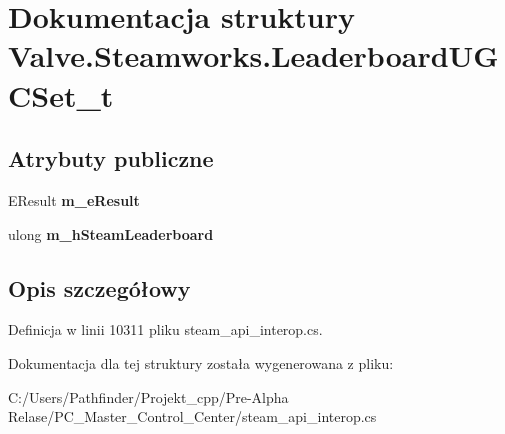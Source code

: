 \hypertarget{struct_valve_1_1_steamworks_1_1_leaderboard_u_g_c_set__t}{}\section{Dokumentacja struktury Valve.\+Steamworks.\+Leaderboard\+U\+G\+C\+Set\+\_\+t}
\label{struct_valve_1_1_steamworks_1_1_leaderboard_u_g_c_set__t}
\subsection*{Atrybuty publiczne}
\begin{DoxyCompactItemize}
\item 
\mbox{\label{struct_valve_1_1_steamworks_1_1_leaderboard_u_g_c_set__t_a882efa620bdd870901a0411f8df32756}} 
E\+Result {\bfseries m\+\_\+e\+Result}
\item 
\mbox{\label{struct_valve_1_1_steamworks_1_1_leaderboard_u_g_c_set__t_a9e0433f9d1a1813eb5e02ff0772368bc}} 
ulong {\bfseries m\+\_\+h\+Steam\+Leaderboard}
\end{DoxyCompactItemize}


\subsection{Opis szczegółowy}


Definicja w linii 10311 pliku steam\+\_\+api\+\_\+interop.\+cs.



Dokumentacja dla tej struktury została wygenerowana z pliku\+:\begin{DoxyCompactItemize}
\item 
C\+:/\+Users/\+Pathfinder/\+Projekt\+\_\+cpp/\+Pre-\/\+Alpha Relase/\+P\+C\+\_\+\+Master\+\_\+\+Control\+\_\+\+Center/steam\+\_\+api\+\_\+interop.\+cs\end{DoxyCompactItemize}
